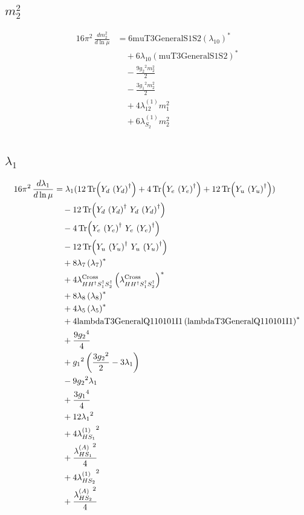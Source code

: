 \documentclass[10pt,a4paper]{article}
\begin{document}
\subsection*{$m_2^2$}
\begin{align*}
16\pi^2\,\frac{d m_2^2}{d\ln\mu} &=6 \text{muT3GeneralS1S2} \left({\lambda_{10}}\right)^{*} \\
&\quad +6 {\lambda_{10}} \left(\text{muT3GeneralS1S2}\right)^{*} \\
&\quad -\frac{9 {g_2}^2 {m_2^2}}{2} \\
&\quad -\frac{3 {g_1}^2 {m_2^2}}{2} \\
&\quad +4 {\lambda_{12}^{(1)}} {m_1^2} \\
&\quad +6 {\lambda_{S_2}^{(1)}} {m_2^2} \\
\end{align*}
\subsection*{$\lambda_1$}
\begin{align*}
16\pi^2\,\frac{d \lambda_1}{d\ln\mu} &={\lambda_1} (12 \operatorname{Tr}\!\left({Y_d}\,\left({Y_d}\right)^{\dagger}\right)+4 \operatorname{Tr}\!\left({Y_e}\,\left({Y_e}\right)^{\dagger}\right)+12 \operatorname{Tr}\!\left({Y_u}\,\left({Y_u}\right)^{\dagger}\right)) \\
&\quad -12 \operatorname{Tr}\!\left({Y_d}\,\left({Y_d}\right)^{\dagger}\,{Y_d}\,\left({Y_d}\right)^{\dagger}\right) \\
&\quad -4 \operatorname{Tr}\!\left({Y_e}\,\left({Y_e}\right)^{\dagger}\,{Y_e}\,\left({Y_e}\right)^{\dagger}\right) \\
&\quad -12 \operatorname{Tr}\!\left({Y_u}\,\left({Y_u}\right)^{\dagger}\,{Y_u}\,\left({Y_u}\right)^{\dagger}\right) \\
&\quad +8 {\lambda_{7}} \left({\lambda_{7}}\right)^{*} \\
&\quad +4 {\lambda_{H H^\dagger S_1^\dagger S_2^\dagger}^{\rm Cross}} \left({\lambda_{H H^\dagger S_1^\dagger S_2^\dagger}^{\rm Cross}}\right)^{*} \\
&\quad +8 {\lambda_{8}} \left({\lambda_{8}}\right)^{*} \\
&\quad +4 {\lambda_5} \left({\lambda_5}\right)^{*} \\
&\quad +4 \text{lambdaT3GeneralQ110101I1} \left(\text{lambdaT3GeneralQ110101I1}\right)^{*} \\
&\quad +\frac{9 {g_2}^4}{4} \\
&\quad +{g_1}^2 \left(\frac{3 {g_2}^2}{2}-3 {\lambda_1}\right) \\
&\quad -9 {g_2}^2 {\lambda_1} \\
&\quad +\frac{3 {g_1}^4}{4} \\
&\quad +12 {\lambda_1}^2 \\
&\quad +4 {\lambda_{HS_1}^{(1)}}^2 \\
&\quad +\frac{{\lambda_{HS_1}^{(A)}}^2}{4} \\
&\quad +4 {\lambda_{HS_2}^{(1)}}^2 \\
&\quad +\frac{{\lambda_{HS_2}^{(A)}}^2}{4} \\
\end{align*}
\end{document}
